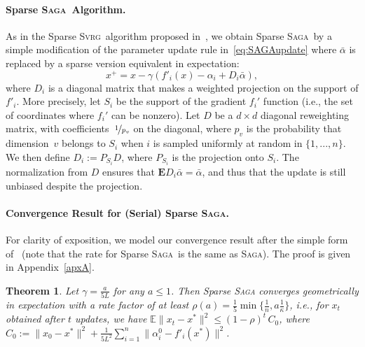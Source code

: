 \documentclass[twoside]{article}
\newcommand{\stepsize}{\gamma}
\newcommand{\lipschitz}{L}
\newcommand{\E}{\mathbb{E}}
\newcommand{\Econd}{\mathbf{E}}
\newcommand{\SAGA}{\textsc{Saga}}
\newcommand{\SVRG}{\textsc{Svrg}}
\newtheorem{theorem}{Theorem}
\begin{document}
\paragraph{Sparse \SAGA\ Algorithm.}
As in the Sparse \SVRG\ algorithm proposed in~\citet{mania}, we obtain Sparse \SAGA\ by a simple modification of the parameter update rule in~\eqref{eq:SAGAupdate} where $\bar{\alpha}$ is replaced by a sparse version equivalent in expectation: 
\begin{equation} \label{eq:SparseSAGA}
x^{+} = x - \stepsize (f'_i(x) - \alpha_i + D_i \bar \alpha),
\end{equation}
where $D_i$ is a diagonal matrix that makes a weighted projection on the support of $f'_i$.
More precisely, let $S_i$ be the support of the gradient $f_i'$ function (i.e., the set of coordinates where $f_i'$ can be nonzero). Let $D$ be a $d\times d$ diagonal reweighting matrix, with coefficients~$\nicefrac{1}{p_v}$ on the diagonal, where $p_v$ is the probability that dimension~$v$ belongs to $S_i$ when $i$ is sampled uniformly at random in $\{1,...,n\}$.
We then define $D_i := P_{S_i} D$, where $P_{S_i}$ is the projection onto $S_i$. The normalization from $D$
ensures that $\Econd D_i \bar \alpha = \bar{\alpha}$, and thus that the update is still unbiased despite the projection.

\vspace{-2mm}
\paragraph{Convergence Result for (Serial) Sparse \SAGA.}
For clarity of exposition, we model our convergence result after the simple form of~\citet[Corollary~3]{qsaga} (note that the rate for Sparse \SAGA\ is the same as \SAGA). The proof is given in Appendix~\ref{apxA}.

\begin{theorem}\label{th1}
Let $\stepsize = \frac{a}{5\lipschitz}$ for any $a\leq1$. 
Then \textnormal{Sparse \SAGA} converges geometrically in expectation with a rate factor of at least $\rho(a) = \frac{1}{5} \min\big\{\frac{1}{n}, a\frac{1}{\kappa}\big\}$, i.e., for $x_t$ obtained after $t$ updates, we have ${\E \|x_t - x^*\|^2} \leq {(1-\rho)}^t \,  C_0$, where $C_0 := \|x_0 - x^*\|^2 + \frac{1}{5L^2} \sum_{i=1}^n {\|\alpha_i^0 - f'_i(x^*)\|^2}$.
\end{theorem}

\vspace{-2mm}
\end{document}
